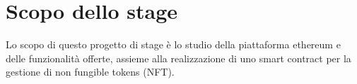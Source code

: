 \section*{Scopo dello stage}
Lo scopo di questo progetto di stage è lo studio della piattaforma
ethereum e delle funzionalità offerte, assieme alla realizzazione di
uno smart contract per la gestione di non fungible tokens (NFT).


